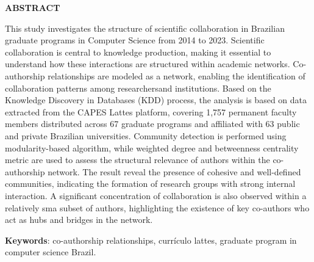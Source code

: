\cleardoublepage
\begin{titlepage}
\centering
\textbf{\large ABSTRACT} %
\vspace{1cm}


\justifying
This study investigates the structure of scientific collaboration in Brazilian graduate programs in Computer Science from 2014 to 2023. Scientific collaboration is central to knowledge production, making it essential to understand how these interactions are structured within academic networks. Co-authorship relationships are modeled as a network, enabling the identification of collaboration patterns among researchersand institutions. Based on the Knowledge Discovery in Databases (KDD) process, the analysis is based on data extracted from the CAPES Lattes platform, covering 1,757 permanent faculty members distributed across  67 graduate programs and affiliated with 63 public and private Brazilian universities. Community detection is performed using modularity-based algorithm, while weighted degree and betweenness centrality metric are used to assess the structural relevance of authors within the co-authorship network. The result reveal the presence of cohesive and well-defined communities, indicating the formation of research groups with strong internal interaction. A significant concentration of collaboration is also observed within a relatively sma subset of authors, highlighting the existence of key co-authors who act as hubs and bridges in the network.

\vspace{0.5cm}

\textbf{Keywords}: co-authorship relationships, currículo lattes, graduate program in computer science Brazil. 

\end{titlepage}